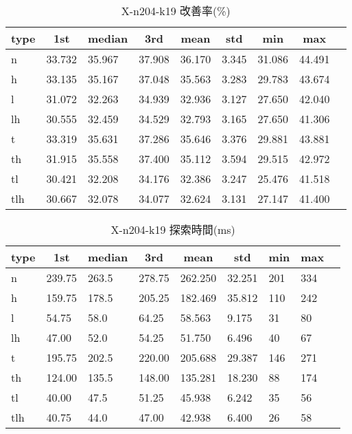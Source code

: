 \begin{table}[htbp]
    \centering
    \caption{X-n204-k19 改善率(\%)}
    \begin{tabular}{|l|l|l|l|l|l|l|l|l|}\hline
    \multicolumn{1}{|c|}{\textbf{type}}
    &\multicolumn{1}{|c|}{\textbf{1st}}
    &\multicolumn{1}{c|}{\textbf{median}}
    &\multicolumn{1}{c|}{\textbf{3rd}}
    &\multicolumn{1}{c|}{\textbf{mean}}
    &\multicolumn{1}{c|}{\textbf{std}}
    &\multicolumn{1}{c|}{\textbf{min}}
    &\multicolumn{1}{c|}{\textbf{max}}\\\hline
	n & 33.732 & 35.967 & 37.908 & 36.170 & 3.345 & 31.086 & 44.491\\\hline
	h & 33.135 & 35.167 & 37.048 & 35.563 & 3.283 & 29.783 & 43.674\\\hline
	l & 31.072 & 32.263 & 34.939 & 32.936 & 3.127 & 27.650 & 42.040\\\hline
	lh & 30.555 & 32.459 & 34.529 & 32.793 & 3.165 & 27.650 & 41.306\\\hline
	t & 33.319 & 35.631 & 37.286 & 35.646 & 3.376 & 29.881 & 43.881\\\hline
	th & 31.915 & 35.558 & 37.400 & 35.112 & 3.594 & 29.515 & 42.972\\\hline
	tl & 30.421 & 32.208 & 34.176 & 32.386 & 3.247 & 25.476 & 41.518\\\hline
	tlh & 30.667 & 32.078 & 34.077 & 32.624 & 3.131 & 27.147 & 41.400\\\hline
	\end{tabular}
\end{table}
\begin{table}[htbp]
    \centering
    \caption{X-n204-k19 探索時間(ms)}
    \begin{tabular}{|l|l|l|l|l|l|l|l|l|}\hline
    \multicolumn{1}{|c|}{\textbf{type}}
    &\multicolumn{1}{|c|}{\textbf{1st}}
    &\multicolumn{1}{c|}{\textbf{median}}
    &\multicolumn{1}{c|}{\textbf{3rd}}
    &\multicolumn{1}{c|}{\textbf{mean}}
    &\multicolumn{1}{c|}{\textbf{std}}
    &\multicolumn{1}{c|}{\textbf{min}}
    &\multicolumn{1}{c|}{\textbf{max}}\\\hline
	n & 239.75 & 263.5 & 278.75 & 262.250 & 32.251 & 201 & 334\\\hline
	h & 159.75 & 178.5 & 205.25 & 182.469 & 35.812 & 110 & 242\\\hline
	l & 54.75 & 58.0 & 64.25 & 58.563 & 9.175 & 31 & 80\\\hline
	lh & 47.00 & 52.0 & 54.25 & 51.750 & 6.496 & 40 & 67\\\hline
	t & 195.75 & 202.5 & 220.00 & 205.688 & 29.387 & 146 & 271\\\hline
	th & 124.00 & 135.5 & 148.00 & 135.281 & 18.230 & 88 & 174\\\hline
	tl & 40.00 & 47.5 & 51.25 & 45.938 & 6.242 & 35 & 56\\\hline
	tlh & 40.75 & 44.0 & 47.00 & 42.938 & 6.400 & 26 & 58\\\hline
	\end{tabular}
\end{table}
